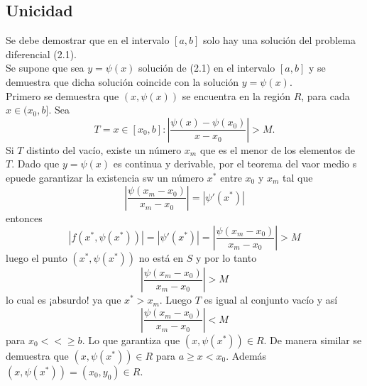 \documentclass[10pt,a4paper,notitlepage]{report}
\begin{document}
\begin{itemize}
\subsection{Unicidad}
Se debe demostrar que en el intervalo $[a, b]$ solo hay una solución del problema diferencial (2.1). \\
Se supone que sea $y = \psi (x)$ solución de (2.1) en el intervalo $[a, b]$ y se demuestra que dicha solución coincide con la solución $y = \psi(x)$. \\
Primero se demuestra que $(x, \psi (x))$ se encuentra en la región $R$, para cada $x \in (x_{0}, b]$. Sea 
\begin{equation}
T= { x \in [x_{0}, b] : |\frac{\psi (x) - \psi (x_{0})}{x - x_{0}}| > M }.
\end{equation}
Si $T$ distinto del vacío, existe un número $x_{m}$ que es el menor de los elementos de $T$. Dado que $y = \psi (x)$ es continua y derivable, por el teorema del vaor medio s epuede garantizar la existencia sw un número $x^{*}$ entre $x_{0}$ y $x_{m}$ tal que
\begin{equation}
|\frac{\psi (x_{m} - x_{0})}{x_{m} - x_{0}}| = | \psi' (x^{*})|
\end{equation}
entonces
\begin{equation}
|f(x^{*}, \psi(x^{*}))| = |\psi' (x^{*})| = |\frac{\psi (x_{m} - x_{0})}{x_{m} - x_{0}}| > M
\end{equation}
luego el punto $(x^{*}, \psi(x^{*}))$ no está en $S$ y por lo tanto
\begin{equation}
|\frac{\psi (x_{m} - x_{0})}{x_{m} - x_{0}}| > M
\end{equation}
lo cual es ¡absurdo! ya que $x^{*} > x_{m}$.  Luego $T$ es igual al conjunto vacío y así
\begin{equation}
|\frac{\psi (x_{m} - x_{0})}{x_{m} - x_{0}}| < M
\end{equation}
para $x_{0} < < \geq b$. Lo que garantiza que $(x, \psi (x^{*})) \in R$. De manera similar se demuestra que  $(x, \psi (x^{*})) \in R$ para $a \geq x < x_{0}$.
Además $(x, \psi (x^{*})) = (x_{0}, y_{0}) \in R$.

\end{itemize}
\end{document}
